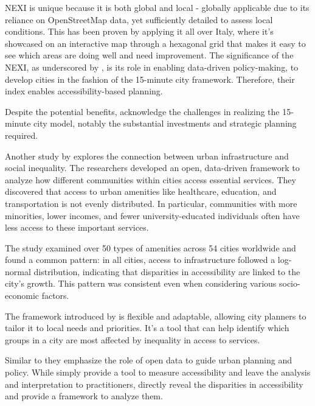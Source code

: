 NEXI is unique because it is both global and local - globally applicable due to its reliance on OpenStreetMap data, yet sufficiently detailed to assess local conditions.
This has been proven by applying it all over Italy, where it's showcased on an interactive map through a hexagonal grid that makes it easy to see which areas are doing well and need improvement.
The significance of the NEXI, as underscored by \cite{olivariAreItalianCities2023}, is its role in enabling data-driven policy-making, to develop cities in the fashion of the 15-minute city framework. 
Therefore, their index enables accessibility-based planning.

Despite the potential benefits, \cite{olivariAreItalianCities2023} acknowledge the challenges in realizing the 15-minute city model, notably the substantial investments and strategic planning required. 

Another study by \cite{nicolettiDisadvantagedCommunitiesHave2023} explores the connection between urban infrastructure and social inequality. 
The researchers developed an open, data-driven framework to analyze how different communities within cities access essential services. 
They discovered that access to urban amenities like healthcare, education, and transportation is not evenly distributed. 
In particular, communities with more minorities, lower incomes, and fewer university-educated individuals often have less access to these important services.

The study examined over 50 types of amenities across 54 cities worldwide and found a common pattern: in all cities, access to infrastructure followed a log-normal distribution, indicating that disparities in accessibility are linked to the city's growth. 
This pattern was consistent even when considering various socio-economic factors.

The framework introduced by \cite{nicolettiDisadvantagedCommunitiesHave2023} is flexible and adaptable, allowing city planners to tailor it to local needs and priorities. 
It's a tool that can help identify which groups in a city are most affected by inequality in access to services. 

Similar to \cite{olivariAreItalianCities2023} they emphasize the role of open data to guide urban planning and policy.
While \cite{olivariAreItalianCities2023} simply provide a tool to measure accessibility and leave the analysis and interpretation to practitioners, \cite{nicolettiDisadvantagedCommunitiesHave2023} directly reveal the disparities in accessibility and provide a framework to analyze them.

